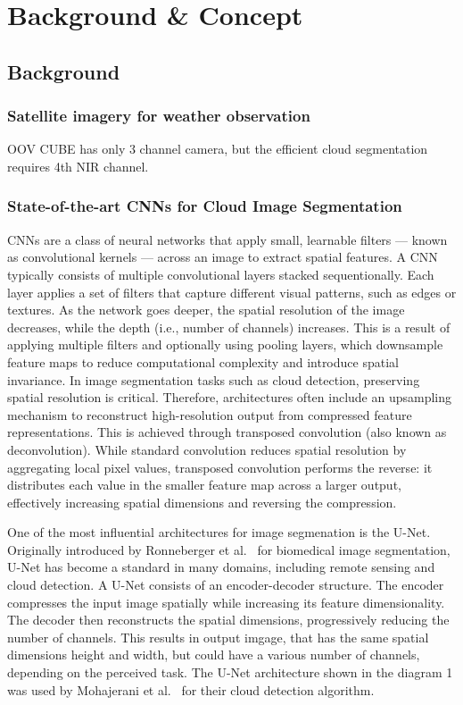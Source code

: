 {

\setlength{\parindent}{0pt}
\setlength{\parskip}{1em}

\section{Background \& Concept}
\subsection{Background}
\subsubsection{Satellite imagery for weather observation}
OOV CUBE has only 3 channel camera, but the efficient cloud segmentation requires 4th NIR channel. 
\subsubsection{State-of-the-art CNNs for Cloud Image Segmentation}

CNNs are a class of neural networks that apply small, learnable filters --- known as convolutional kernels --– across an image to extract spatial features. A CNN typically consists of multiple convolutional layers stacked sequentionally. Each layer applies a set of filters that capture different visual patterns, such as edges or textures. As the network goes deeper, the spatial resolution of the image decreases, while the depth (i.e., number of channels) increases. This is a result of applying multiple filters and optionally using pooling layers, which downsample feature maps to reduce computational complexity and introduce spatial invariance.
In image segmentation tasks such as cloud detection, preserving spatial resolution is critical. Therefore, architectures often include an upsampling mechanism to reconstruct high-resolution output from compressed feature representations. This is achieved through transposed convolution (also known as deconvolution). While standard convolution reduces spatial resolution by aggregating local pixel values, transposed convolution performs the reverse: it distributes each value in the smaller feature map across a larger output, effectively increasing spatial dimensions and reversing the compression.

One of the most influential architectures for image segmenation is the U-Net. Originally introduced by Ronneberger et al.~\cite{ronneberger2015u} for biomedical image segmentation, U-Net has become a standard in many domains, including remote sensing and cloud detection. A U-Net consists of an encoder-decoder structure. The encoder compresses the input image spatially while increasing its feature dimensionality. The decoder then reconstructs the spatial dimensions, progressively reducing the number of channels. This results in output imgage, that has the same spatial dimensions height and width, but could have a various number of channels, depending on the perceived task. The U-Net architecture shown in the diagram 1 was used by Mohajerani et al.~\cite{mohajerani2019cloudnet}  for their cloud detection algorithm.

}
